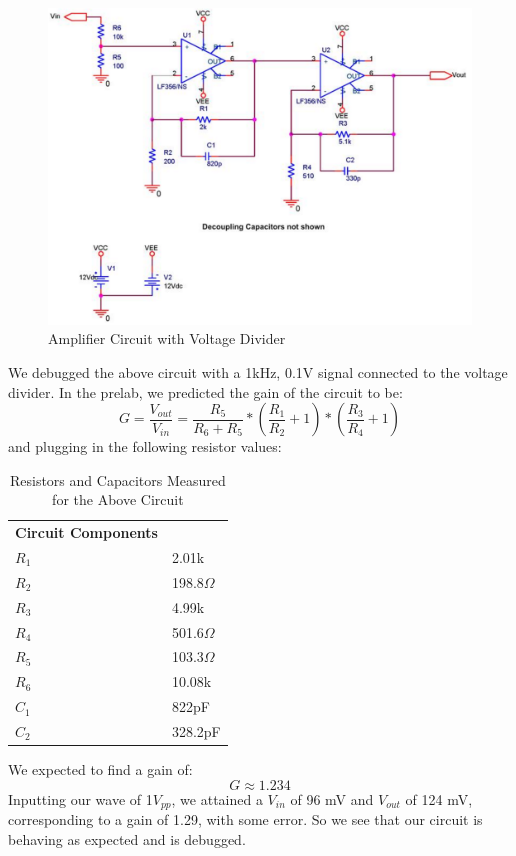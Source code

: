 \documentclass{article}
\begin{document}
\subsection{}
    \begin{figure}[H]
        \centering
        \includegraphics[scale = 0.5]{4.png}
        \caption{Amplifier Circuit with Voltage Divider \cite{lab9}}
        \label{fig:my_label}
    \end{figure}
    We debugged the above circuit with a 1kHz, 0.1V signal connected to the voltage divider. In the prelab, we predicted the gain of the circuit to be:
    \begin{equation}
        G = \frac{V_{out}}{V_{in}} = \frac{R_5}{R_6 + R_5}*(\frac{R_1}{R_2}+1)*(\frac{R_3}{R_4}+1)
    \end{equation}
    and plugging in the following resistor values:
    \begin{table}[H]
        \centering
        \caption{Resistors and Capacitors Measured for the Above Circuit}
        \label{my-label}
        \begin{tabular}{ll}
        \textbf{Circuit Components} &  \\ \cline{1-1}
        \textbf{$R_1$} & 2.01k \\
        \textbf{$R_2$} & 198.8$\Omega$ \\
        \textbf{$R_3$} & 4.99k \\
        \textbf{$R_4$} & 501.6$\Omega$ \\
        \textbf{$R_5$} & 103.3$\Omega$ \\
        \textbf{$R_6$} & 10.08k \\
        \textbf{$C_1$} & 822pF \\
        \textbf{$C_2$} & 328.2pF
        \end{tabular}
        \end{table}
    We expected to find a gain of:
    \begin{equation}
        G \approx 1.234
    \end{equation}
    Inputting our wave of 1$V_{pp}$, we attained a $V_{in}$ of 96 mV and $V_{out}$ of 124 mV, corresponding to a gain of 1.29, with some error. So we see that our circuit is behaving as expected and is debugged.
    
\end{document}
